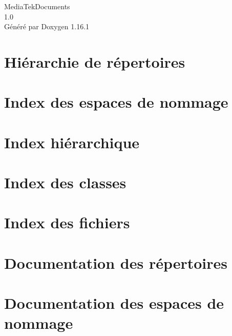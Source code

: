 \documentclass[twoside]{book}
\newcommand{\+}{\discretionary{\mbox{\scriptsize$\hookleftarrow$}}{}{}}
\newcommand{\clearemptydoublepage}{%
    \newpage{\pagestyle{empty}\cleardoublepage}%
  }
\begin{document}
  \raggedbottom
  \begin{titlepage}
  \vspace*{7cm}
  \begin{center}%
  {\Large Media\+Tek\+Documents}\\
  [1ex]\large 1.\+0 \\
  \vspace*{1cm}
  {\large Généré par Doxygen 1.16.1}\\
  \end{center}
  \end{titlepage}
  \clearemptydoublepage
  \tableofcontents
  \clearemptydoublepage
\chapter{Hiérarchie de répertoires}

\chapter{Index des espaces de nommage}

\chapter{Index hiérarchique}

\chapter{Index des classes}

\chapter{Index des fichiers}

\chapter{Documentation des répertoires}








\chapter{Documentation des espaces de nommage}







\end{document}
